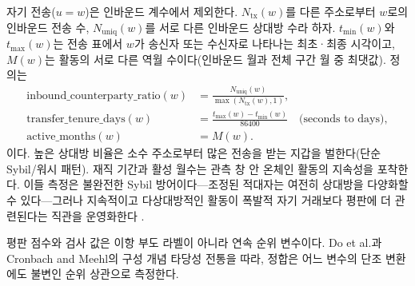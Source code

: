 자기 전송($u=w$)은 인바운드 계수에서 제외한다. $N_{\mathrm{tx}}(w)$를 다른 주소로부터 $w$로의 인바운드 전송 수, $N_{\mathrm{uniq}}(w)$를 서로 다른 인바운드 상대방 수라 하자. $t_{\min}(w)$와 $t_{\max}(w)$는 전송 표에서 $w$가 송신자 또는 수신자로 나타나는 최초·최종 시각이고, $M(w)$는 활동의 서로 다른 역월 수이다(인바운드 월과 전체 구간 월 중 최댓값). 정의는
\begin{align}
\mathrm{inbound\_counterparty\_ratio}(w)
&=
\frac{N_{\mathrm{uniq}}(w)}{\max(N_{\mathrm{tx}}(w),1)},
\label{eq:counterparty-ratio}\\
\mathrm{transfer\_tenure\_days}(w)
&=
\frac{t_{\max}(w)-t_{\min}(w)}{86400}\quad\text{(seconds to days)},
\label{eq:tenure}\\
\mathrm{active\_months}(w)
&=
M(w).
\label{eq:active-months}
\end{align}
이다. 높은 상대방 비율은 소수 주소로부터 많은 전송을 받는 지갑을 벌한다(단순 Sybil/워시 패턴). 재직 기간과 활성 월수는 관측 창 안 온체인 활동의 지속성을 포착한다. 이들 측정은 불완전한 Sybil 방어이다---조정된 적대자는 여전히 상대방을 다양화할 수 있다---그러나 지속적이고 다상대방적인 활동이 폭발적 자기 거래보다 평판에 더 관련된다는 직관을 운영화한다 .


평판 점수와 검사 값은 이항 부도 라벨이 아니라 연속 순위 변수이다. Do et al.과 Cronbach and Meehl의 구성 개념 타당성 전통을 따라, 정합은 어느 변수의 단조 변환에도 불변인 순위 상관으로 측정한다.

